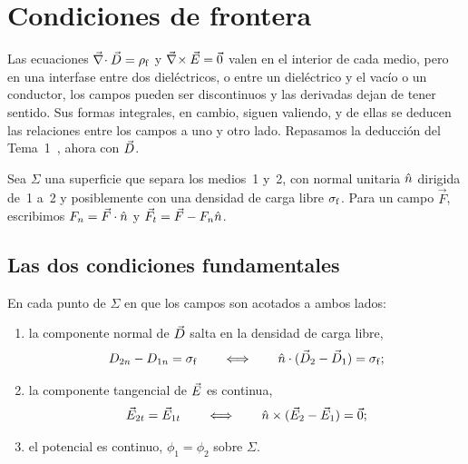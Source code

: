 \section{Condiciones de frontera}\label{sec:frontera}

Las ecuaciones $\vec\nabla\!\cdot\vec D=\rho_{\mathrm f}$ y $\vec\nabla\!\times\vec E=\vec 0$ valen en el interior de cada medio, pero en una interfase entre
dos dieléctricos, o entre un dieléctrico y el vacío o un conductor, los campos pueden ser discontinuos y
las derivadas dejan de tener sentido. Sus formas integrales, en cambio, siguen valiendo, y de ellas se
deducen las relaciones entre los campos a uno y otro lado. Repasamos la deducción del Tema~1~\cite{T1},
ahora con $\vec D$.

Sea $\Sigma$ una superficie que separa los medios~1 y~2, con normal unitaria $\hat n$ dirigida de~1 a~2 y
posiblemente con una densidad de carga libre $\sigma_{\mathrm f}$. Para un campo $\vec F$, escribimos $F_n=\vec F\cdot\hat n$ y
$\vec F_t=\vec F-F_n\hat n$.



\subsection{Las dos condiciones fundamentales}\label{sec:condiciones}

\begin{teorema}\label{teo:frontera}
En cada punto de $\Sigma$ en que los campos son acotados a ambos lados:
\begin{enumerate}
  \item la componente normal de $\vec D$ salta en la densidad de carga libre,
        \begin{equation}\label{eq:frontera-D}
          D_{2n}-D_{1n}=\sigma_{\mathrm f}
          \qquad\Longleftrightarrow\qquad
          \hat n\cdot(\vec D_2-\vec D_1)=\sigma_{\mathrm f} ;
        \end{equation}
  \item la componente tangencial de $\vec E$ es continua,
        \begin{equation}\label{eq:frontera-E}
          \vec E_{2t}=\vec E_{1t}
          \qquad\Longleftrightarrow\qquad
          \hat n\times(\vec E_2-\vec E_1)=\vec 0 ;
        \end{equation}
  \item el potencial es continuo, $\phi_1=\phi_2$ sobre $\Sigma$.
\end{enumerate}
\end{teorema}

